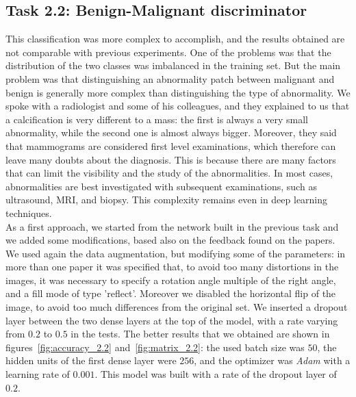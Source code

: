 \documentclass[11pt,a4paper,oneside]{article}
\begin{document}
\subsection{Task 2.2: Benign-Malignant discriminator}
This classification was more complex to accomplish, and the results obtained are not comparable with previous experiments. One of the problems was that the distribution of the two classes was imbalanced in the training set. But the main problem was that distinguishing an abnormality patch between malignant and benign is generally more complex than distinguishing the type of abnormality. 
We spoke with a radiologist and some of his colleagues, and they explained to us that a calcification is very different to a mass: the first is always a very small abnormality, while the second one is almost always bigger. Moreover, they said that mammograms are considered first level examinations, which therefore can leave many doubts about the diagnosis. This is because there are many factors that can limit the visibility and the study of the abnormalities. 
In most cases, abnormalities are best investigated with subsequent examinations, such as ultrasound, MRI, and biopsy.
This complexity remains even in deep learning techniques.\\


As a first approach, we started from the network built in the previous task and we added some modifications, based also on the feedback found on the papers.
We used again the data augmentation, but modifying some of the parameters: in more than one paper it was specified that, to avoid too many distortions in the images, it was necessary to specify a rotation angle multiple of the right angle, and a fill mode of type 'reflect'. Moreover we disabled the horizontal flip of the image, to avoid too much differences from the original set.
We inserted a dropout layer between the two dense layers at the top of the model, with a rate varying from $0.2$ to $0.5$ in the tests.
The better results that we obtained are shown in figures~\ref{fig:accuracy_2.2} and~\ref{fig:matrix_2.2}: the used batch size was $50$, the hidden units of the first dense layer were $256$, and the optimizer was \textit{Adam} with a learning rate of $0.001$. This model was built with a rate of the dropout layer of $0.2$.
\end{document}
